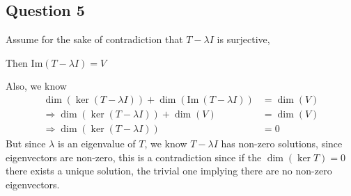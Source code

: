 \documentclass{article}
\begin{document}
\subsection*{Question 5}
Assume for the sake of contradiction that \(T- \lambda I\) is surjective, 

Then \(\mathrm{Im}(T - \lambda I) = V\)

Also, we know
\begin{align*}
    \dim(\ker(T - \lambda I)) + \dim(\mathrm{Im} \ (T - \lambda I)) &= \dim(V)
    \\
    \Rightarrow \dim(\ker (T - \lambda I)) + \dim(V) &= \dim(V)
    \\
    \Rightarrow \dim(\ker (T - \lambda I)) &= 0
\end{align*}
But since \(\lambda\) is an eigenvalue of \(T\), we know \(T - \lambda I\) has non-zero solutions, since eigenvectors are non-zero, 
this is a contradiction since if the \(\dim(\ker T) = 0\) there exists a unique solution, the trivial one implying there are no non-zero eigenvectors.
\end{document}
